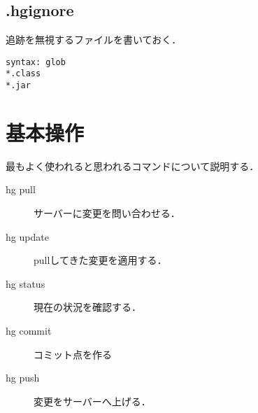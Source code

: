 \documentclass[a4j,openany]{jbook}
\begin{document}
\subsection{.hgignore}
追跡を無視するファイルを書いておく．
 \begin{screen}
\begin{verbatim}
syntax: glob
*.class
*.jar
\end{verbatim}
 \end{screen}

\section{基本操作}
最もよく使われると思われるコマンドについて説明する．
\begin{description}
 \item[hg pull] \mbox\\
            サーバーに変更を問い合わせる．
 \item[hg update] \mbox\\
            pullしてきた変更を適用する．
 \item[hg status] \mbox\\
            現在の状況を確認する．
 \item[hg commit] \mbox\\
            コミット点を作る
 \item[hg push] \mbox\\
            変更をサーバーへ上げる．
\end{description}





\end{document}
